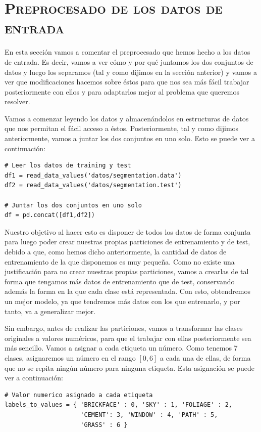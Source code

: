 \documentclass[11pt,a4paper]{article}
\begin{document}
\newpage

\section{\textsc{Preprocesado de los datos de entrada}}

En esta sección vamos a comentar el preprocesado que hemos hecho a los datos de entrada. Es decir, vamos a ver cómo y por qué juntamos
los dos conjuntos de datos y luego los separamos (tal y como dijimos en la sección anterior) y vamos a ver que modificaciones hacemos
sobre éstos para que nos sea más fácil trabajar posteriormente con ellos y para adaptarlos mejor al problema que queremos resolver.

Vamos a comenzar leyendo los datos y almacenándolos en estructuras de datos que nos permitan el fácil acceso a éstos. Posteriormente,
tal y como dijimos anteriormente, vamos a juntar los dos conjuntos en uno solo. Esto se puede ver a continuación:

\begin{lstlisting}
# Leer los datos de training y test
df1 = read_data_values('datos/segmentation.data')
df2 = read_data_values('datos/segmentation.test')

# Juntar los dos conjuntos en uno solo
df = pd.concat([df1,df2])
\end{lstlisting}

Nuestro objetivo al hacer esto es disponer de todos los datos de forma conjunta para luego poder crear nuestras propias particiones de
entrenamiento y de test, debido a que, como hemos dicho anteriormente, la cantidad de datos de entrenamiento de la que disponemos es
muy pequeña. Como no existe una justificación para no crear nuestras propias particiones, vamos a crearlas de tal forma que tengamos más
datos de entrenamiento que de test, conservando además la forma en la que cada clase está representada. Con esto, obtendremos un 
mejor modelo, ya que tendremos más datos con los que entrenarlo, y por tanto, va a generalizar mejor.

Sin embargo, antes de realizar las particiones, vamos a transformar las clases originales a valores numéricos, para que el trabajar
con ellas posteriormente sea más sencillo. Vamos a asignar a cada etiqueta un número. Como tenemos 7 clases, asignaremos un número
en el rango $[0, 6]$ a cada una de ellas, de forma que no se repita ningún número para ninguna etiqueta. Esta asignación se puede ver a
continuación:

\begin{lstlisting}
# Valor numerico asignado a cada etiqueta
labels_to_values = { 'BRICKFACE' : 0, 'SKY' : 1, 'FOLIAGE' : 2,
                     'CEMENT': 3, 'WINDOW' : 4, 'PATH' : 5,
                     'GRASS' : 6 }
\end{lstlisting}
\end{document}

